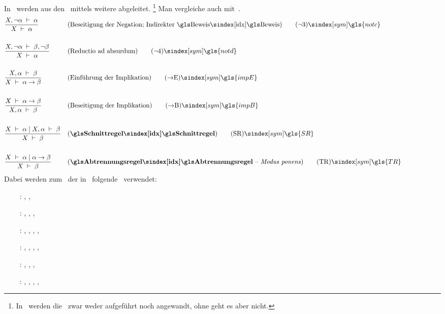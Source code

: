 {In~\cite{bib:Rautenberg} werden aus den \Basisregeln\ mittels  weitere  abgeleitet.%
\footnote{%
	In~\cite{bib:Rautenberg} werden die \Identitaetsregeln\ zwar weder aufgeführt noch angewandt, ohne  geht es aber nicht.
}
Man vergleiche auch mit~\cite{bib:NatuerlichesSchliessen}.
%
\begin{align}
	& \frac{X,\lnot\alpha\derive\alpha}{X\derive\alpha}
	& & (\text{Beseitigung der Negation; Indirekter \Beweis})
	\tag{\tagnotc} \sym{\gls{notc}} \label{def:notc}
	\\\\
	& \frac{X,\lnot\alpha\derive\beta,\lnot\beta}{X\derive\alpha}
	& & (\text{Reductio ad absurdum})
	\tag{\tagnotd} \sym{\gls{notd}} \label{def:notd}
	\\\\
	& \frac{X,\alpha\derive\beta}{X\derive\alpha\limp\beta}
	& & (\text{Einführung der Implikation})
	\tag{\tagimpE} \sym{\gls{impE}} \label{def:impE}
	\\\\
	& \frac{X\derive\alpha\limp\beta}{X,\alpha\derive\beta}
	& & (\text{Beseitigung der Implikation})
	\tag{\tagimpB} \sym{\gls{impB}} \label{def:impB}
	\\\\
	& \frac{X\derive\alpha \srand X,\alpha\derive\beta}{X\derive\beta}
	& & (\text{\defn{\glsIdx{Schnittregel}}})
	\tag{\tagSR} \sym{\gls{SR}} \label{def:SR}
	\\\\
	& \frac{X\derive\alpha \srand \alpha\limp\beta}{X\derive\beta}
	& & (\text{\defn{\Abtrennungsregel} -- \emph{Modus ponens}})
	\tag{\tagTR} \sym{\gls{TR}} \label{def:TR}
	\formulatoleft
\end{align}
%
Dabei werden zum \Beweis\ der  in~\cite{bib:Rautenberg} folgende \Basisregeln\ verwendet:
\begin{itemize}
	\renewcommand*{\itemindent}{1cm}
	\renewcommand*{\labelsep}{5pt}
	\item[\tagnotc~:] \tagAR, \tagMR,           \tagnotb
	\item[\tagnotd~:] \tagAR, \tagMR, \tagnota, \tagnotb
	\item[\tagimpE~:] \tagAR, \tagMR, \tagnota, \tagnotb, \tagandE
	\item[\tagimpB~:] \tagAR, \tagMR, \tagnota, \tagnotb          , \tagandB
	\item[\tagSR  ~:] \tagAR, \tagMR, \tagnota, \tagnotb
	\item[\tagTR  ~:] \tagAR, \tagMR, \tagnota, \tagnotb, \tagandE
\end{itemize}
%
}
